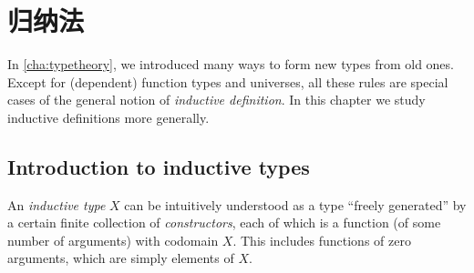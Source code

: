 \chapter{归纳法}
\label{cha:induction}

In \cref{cha:typetheory}, we introduced many ways to form new types from old ones.
Except for (dependent) function types and universes, all these rules are special cases of the general notion of \emph{inductive definition}.
In this chapter we study inductive definitions more generally.


\section{Introduction to inductive types}
\label{sec:bool-nat}

%
An \emph{inductive type} $X$ can be intuitively understood as a type ``freely generated'' by a certain finite collection of \emph{constructors}, each of which is a function (of some number of arguments) with codomain $X$.
This includes functions of zero arguments, which are simply elements of $X$.

